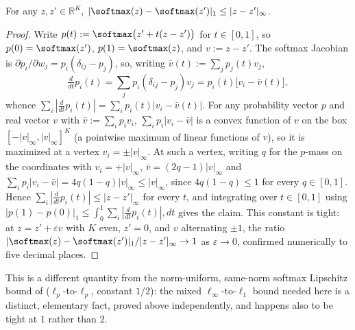 \begin{lemma}
\label{lem:softmax-lipschitz}
For any $z,z'\in\mathbb R^K$, $|\softmax(z)-\softmax(z')|_1\le|z-z'|_\infty$.
\end{lemma}
\begin{proof}
Write $p(t):=\softmax\bigl(z'+t(z-z')\bigr)$ for $t\in[0,1]$, so
$p(0)=\softmax(z')$, $p(1)=\softmax(z)$, and $v:=z-z'$. The softmax
Jacobian is $\partial p_i/\partial w_j=p_i(\delta_{ij}-p_j)$, so, writing
$\bar v(t):=\sum_jp_j(t)v_j$,
\[
 \tfrac{d}{dt}p_i(t)=\sum_j p_i(\delta_{ij}-p_j)v_j
 =p_i(t)\bigl[v_i-\bar v(t)\bigr],
\]
whence $\sum_i|\tfrac{d}{dt}p_i(t)|=\sum_ip_i(t)|v_i-\bar v(t)|$. For any
probability vector $p$ and real vector $v$ with $\bar v:=\sum_ip_iv_i$,
$\sum_ip_i|v_i-\bar v|$ is a convex function of $v$ on the box
$[-|v|_\infty,|v|_\infty]^K$ (a pointwise maximum of linear functions
of $v$), so it is maximized at a vertex $v_i=\pm|v|_\infty$. At such a
vertex, writing $q$ for the $p$-mass on the coordinates with
$v_i=+|v|_\infty$, $\bar v=(2q-1)|v|_\infty$ and
$\sum_ip_i|v_i-\bar v|=4q(1-q)|v|_\infty\le|v|_\infty$, since
$4q(1-q)\le1$ for every $q\in[0,1]$. Hence
$\sum_i|\tfrac{d}{dt}p_i(t)|\le|z-z'|_\infty$ for every $t$, and
integrating over $t\in[0,1]$ using
$|p(1)-p(0)|_1\le\int_0^1\sum_i|\tfrac{d}{dt}p_i(t)|,dt$ gives the
claim. This constant is tight: at $z=z'+\varepsilon v$ with $K$ even,
$z'=0$, and $v$ alternating $\pm1$, the ratio
$|\softmax(z)-\softmax(z')|_1/|z-z'|_\infty\to1$ as $\varepsilon\to0$,
confirmed numerically to five decimal places.
\end{proof}

This is a different quantity from the norm-uniform, same-norm softmax Lipschitz
bound of \citet{nair2025softmax} ($\ell_p$-to-$\ell_p$, constant $1/2$): the
mixed $\ell_\infty$-to-$\ell_1$ bound needed here is a distinct, elementary
fact, proved above independently, and happens also to be tight at $1$ rather
than $2$.

